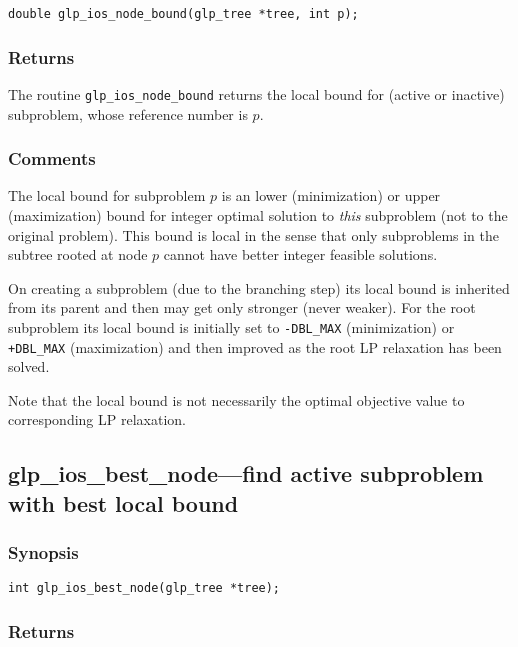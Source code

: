 \begin{verbatim}
double glp_ios_node_bound(glp_tree *tree, int p);
\end{verbatim}

\subsubsection*{Returns}

The routine \verb|glp_ios_node_bound| returns the local bound for
(active or inactive) subproblem, whose reference number is $p$.

\subsubsection*{Comments}

The local bound for subproblem $p$ is an lower (minimization) or upper
(maximization) bound for integer optimal solution to {\it this}
subproblem (not to the original problem). This bound is local in the
sense that only subproblems in the subtree rooted at node $p$ cannot
have better integer feasible solutions.

On creating a subproblem (due to the branching step) its local bound is
inherited from its parent and then may get only stronger (never weaker).
For the root subproblem its local bound is initially set to
\verb|-DBL_MAX| (minimization) or \verb|+DBL_MAX| (maximization) and
then improved as the root LP relaxation has been solved.

Note that the local bound is not necessarily the optimal objective value
to corresponding LP relaxation.

\subsection{glp\_ios\_best\_node---find active subproblem with best
local bound}

\subsubsection*{Synopsis}

\begin{verbatim}
int glp_ios_best_node(glp_tree *tree);
\end{verbatim}

\subsubsection*{Returns}

